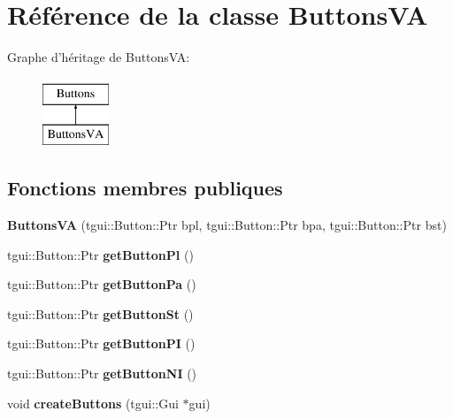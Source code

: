 \hypertarget{classButtonsVA}{\section{Référence de la classe Buttons\+V\+A}
\label{classButtonsVA}
}
Graphe d'héritage de Buttons\+V\+A\+:\begin{figure}[H]
\begin{center}
\leavevmode
\includegraphics[height=2.000000cm]{classButtonsVA}
\end{center}
\end{figure}
\subsection*{Fonctions membres publiques}
\begin{DoxyCompactItemize}
\item 
\hypertarget{classButtonsVA_a146e69faf1e042093a69c2800b35c55b}{{\bfseries Buttons\+V\+A} (tgui\+::\+Button\+::\+Ptr bpl, tgui\+::\+Button\+::\+Ptr bpa, tgui\+::\+Button\+::\+Ptr bst)}\label{classButtonsVA_a146e69faf1e042093a69c2800b35c55b}

\item 
\hypertarget{classButtonsVA_a7c7a96011dc82bc8b57d0b84692ea52b}{tgui\+::\+Button\+::\+Ptr {\bfseries get\+Button\+Pl} ()}\label{classButtonsVA_a7c7a96011dc82bc8b57d0b84692ea52b}

\item 
\hypertarget{classButtonsVA_ab222321660bfaed75d89645fa0ac37a0}{tgui\+::\+Button\+::\+Ptr {\bfseries get\+Button\+Pa} ()}\label{classButtonsVA_ab222321660bfaed75d89645fa0ac37a0}

\item 
\hypertarget{classButtonsVA_aad5dc82aec106cb00f78c92110daad0c}{tgui\+::\+Button\+::\+Ptr {\bfseries get\+Button\+St} ()}\label{classButtonsVA_aad5dc82aec106cb00f78c92110daad0c}

\item 
\hypertarget{classButtonsVA_a625dec1c4ede8100580e957ddac22a17}{tgui\+::\+Button\+::\+Ptr {\bfseries get\+Button\+P\+I} ()}\label{classButtonsVA_a625dec1c4ede8100580e957ddac22a17}

\item 
\hypertarget{classButtonsVA_a15145a6402d6a4688a9c50a5c4fae630}{tgui\+::\+Button\+::\+Ptr {\bfseries get\+Button\+N\+I} ()}\label{classButtonsVA_a15145a6402d6a4688a9c50a5c4fae630}

\item 
\hypertarget{classButtonsVA_a2287bb2ca11365003534bda3c464d09f}{void {\bfseries create\+Buttons} (tgui\+::\+Gui $\ast$gui)}\label{classButtonsVA_a2287bb2ca11365003534bda3c464d09f}

\end{DoxyCompactItemize}


